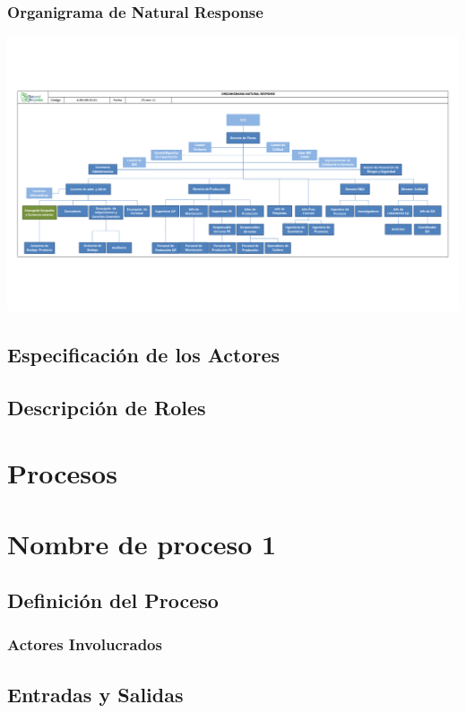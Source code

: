 \documentclass[12pt,letterpaper]{article}
\begin{document}
\subsubsection{Organigrama de Natural Response}
\includegraphics[angle=90,page=1,height=\textheight]{organigrama_nr.pdf}

\subsection{Especificación de los Actores}

\subsection{Descripción de Roles}

\section{Procesos}

\section{Nombre de proceso 1}

\subsection{Definición del Proceso}

\subsubsection{Actores Involucrados}

\subsection{Entradas y Salidas}
\end{document}
